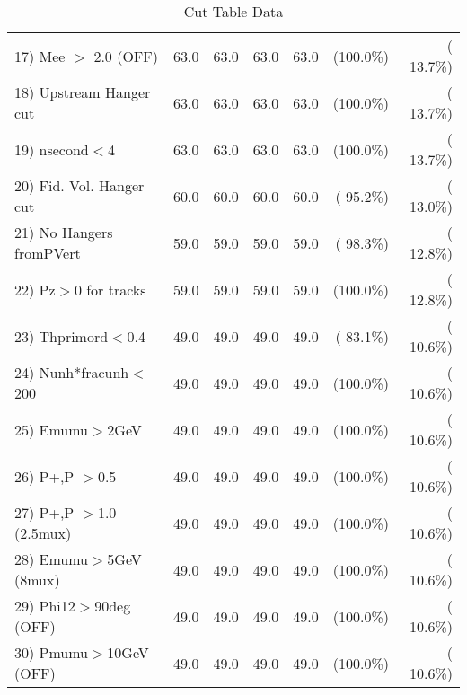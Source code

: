 \begin{table}[h!]
\begin{tabular}{||l||r|r|r|r|r|r||}
 17) Mee $>$ 2.0  (OFF)   &         63.0 &         63.0 &         63.0 &         63.0 & (100.0\%) & ( 13.7\%) \\
 18) Upstream Hanger cut  &         63.0 &         63.0 &         63.0 &         63.0 & (100.0\%) & ( 13.7\%) \\
 19) nsecond$<$4          &         63.0 &         63.0 &         63.0 &         63.0 & (100.0\%) & ( 13.7\%) \\
 20) Fid. Vol. Hanger cut &         60.0 &         60.0 &         60.0 &         60.0 & ( 95.2\%) & ( 13.0\%) \\
 21) No Hangers fromPVert &         59.0 &         59.0 &         59.0 &         59.0 & ( 98.3\%) & ( 12.8\%) \\
 22) Pz$>$0 for tracks    &         59.0 &         59.0 &         59.0 &         59.0 & (100.0\%) & ( 12.8\%) \\
 23) Thprimord$<$0.4      &         49.0 &         49.0 &         49.0 &         49.0 & ( 83.1\%) & ( 10.6\%) \\
 24) Nunh*fracunh$<$200   &         49.0 &         49.0 &         49.0 &         49.0 & (100.0\%) & ( 10.6\%) \\
 25) Emumu$>$2GeV         &         49.0 &         49.0 &         49.0 &         49.0 & (100.0\%) & ( 10.6\%) \\
 26) P+,P-$>$0.5          &         49.0 &         49.0 &         49.0 &         49.0 & (100.0\%) & ( 10.6\%) \\
 27) P+,P-$>$1.0 (2.5mux) &         49.0 &         49.0 &         49.0 &         49.0 & (100.0\%) & ( 10.6\%) \\
 28) Emumu$>$5GeV  (8mux) &         49.0 &         49.0 &         49.0 &         49.0 & (100.0\%) & ( 10.6\%) \\
 29) Phi12$>$90deg  (OFF) &         49.0 &         49.0 &         49.0 &         49.0 & (100.0\%) & ( 10.6\%) \\
 30) Pmumu$>$10GeV  (OFF) &         49.0 &         49.0 &         49.0 &         49.0 & (100.0\%) & ( 10.6\%) \\
 \hline
 \hline
 \end{tabular}
 \caption{Cut Table  Data     }
 \label{tab-cutcohjpsi-mumu_data}
 \end{table}
